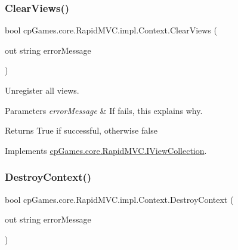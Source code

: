 \mbox{\label{classcp_games_1_1core_1_1_rapid_m_v_c_1_1impl_1_1_context_aa35849819d74cafb71b0056f370872e2}} 
\subsubsection{\texorpdfstring{ClearViews()}{ClearViews()}}
{\footnotesize\ttfamily bool cp\+Games.\+core.\+Rapid\+M\+V\+C.\+impl.\+Context.\+Clear\+Views (\begin{DoxyParamCaption}\item[{out string}]{error\+Message }\end{DoxyParamCaption})}



Unregister all views. 


\begin{DoxyParams}{Parameters}
{\em error\+Message} & If fails, this explains why.\\
\hline
\end{DoxyParams}
\begin{DoxyReturn}{Returns}
True if successful, otherwise false
\end{DoxyReturn}


Implements \mbox{\hyperlink{interfacecp_games_1_1core_1_1_rapid_m_v_c_1_1_i_view_collection_ab7631908f42053edeb586ac79ffbb2c0}{cp\+Games.\+core.\+Rapid\+M\+V\+C.\+I\+View\+Collection}}.

\mbox{\label{classcp_games_1_1core_1_1_rapid_m_v_c_1_1impl_1_1_context_ab8b1ac2f255993564212c4055944f372}} 
\subsubsection{\texorpdfstring{DestroyContext()}{DestroyContext()}}
{\footnotesize\ttfamily bool cp\+Games.\+core.\+Rapid\+M\+V\+C.\+impl.\+Context.\+Destroy\+Context (\begin{DoxyParamCaption}\item[{out string}]{error\+Message }\end{DoxyParamCaption})}



